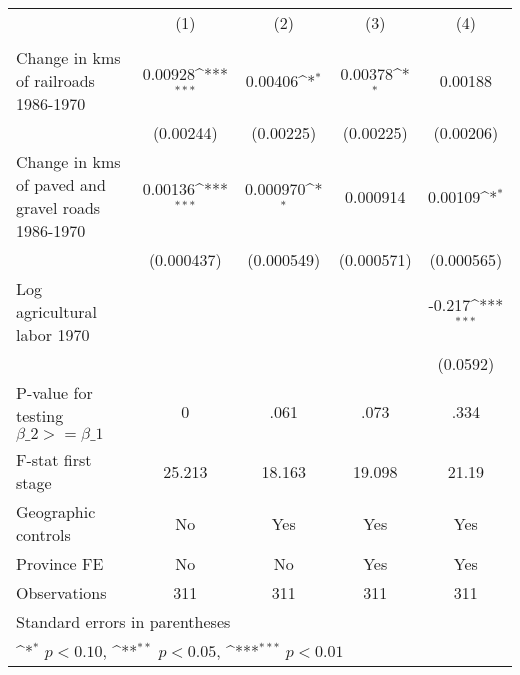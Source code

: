 {
\def\sym#1{\ifmmode^{#1}\else\(^{#1}\)\fi}
\begin{tabular}{l*{4}{c}}
\hline\hline
                &\multicolumn{1}{c}{(1)}&\multicolumn{1}{c}{(2)}&\multicolumn{1}{c}{(3)}&\multicolumn{1}{c}{(4)}\\
                &\multicolumn{1}{c}{}&\multicolumn{1}{c}{}&\multicolumn{1}{c}{}&\multicolumn{1}{c}{}\\
\hline
Change in kms of railroads 1986-1970&  0.00928\sym{***}&  0.00406\sym{*}  &  0.00378\sym{*}  &  0.00188         \\
                &(0.00244)         &(0.00225)         &(0.00225)         &(0.00206)         \\
[1em]
Change in kms of paved and gravel roads 1986-1970&  0.00136\sym{***}& 0.000970\sym{*}  & 0.000914         &  0.00109\sym{*}  \\
                &(0.000437)         &(0.000549)         &(0.000571)         &(0.000565)         \\
[1em]
Log agricultural labor 1970&                  &                  &                  &   -0.217\sym{***}\\
                &                  &                  &                  & (0.0592)         \\
\hline
P-value for testing $\beta\_{2} >= \beta\_{1}$&        0         &     .061         &     .073         &     .334         \\
F-stat first stage&   25.213         &   18.163         &   19.098         &    21.19         \\
Geographic controls&       No         &      Yes         &      Yes         &      Yes         \\
Province FE     &       No         &       No         &      Yes         &      Yes         \\
Observations    &      311         &      311         &      311         &      311         \\
\hline\hline
\multicolumn{5}{l}{\footnotesize Standard errors in parentheses}\\
\multicolumn{5}{l}{\footnotesize \sym{*} \(p<0.10\), \sym{**} \(p<0.05\), \sym{***} \(p<0.01\)}\\
\end{tabular}
}
